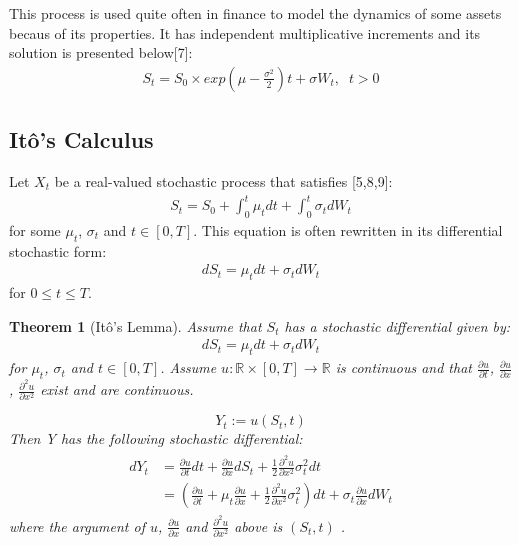\documentclass[12pt,twoside]{reedthesis}
\newtheorem{theorem}{Theorem}[section]
\theoremstyle{definition}
\theoremstyle{definition}
\theoremstyle{remark}
\begin{document}
  This process is used quite often in finance to model the dynamics of
  some assets becaus of its properties. It has independent multiplicative
  increments and its solution is presented below{[}7{]}:
  \begin{align}
  S_t = S_0 \times exp{\left(\mu - \frac{\sigma^2}{2} \right) t + \sigma W_t}, \;\; t > 0
  \end{align}
  \subsection{Itô's Calculus}\label{itos-calculus}
  
  Let \(X_{t}\) be a real-valued stochastic process that satisfies
  {[}5,8,9{]}:
  \begin{align}
  S_t = S_0 + \int_{0}^{t} \mu_t dt + \int_{0}^{t} \sigma_t dW_t
  \end{align}
  \noindent
  for some \(\mu_t\), \(\sigma_t\) and \(t \in [0,T]\). This equation is
  often rewritten in its differential stochastic form:
  \begin{align}
  dS_t = \mu_t dt + \sigma_t dW_t 
  \end{align}
  \noindent
  for \(0 \leq t \leq T\).
  \begin{theorem}[Itô's Lemma]
  Assume that $S_t$ has a stochastic differential given by:
  \begin{align}
  dS_t = \mu_t dt + \sigma_t dW_t 
  \end{align}
  \noindent
  for $\mu_t$, $\sigma_t$ and $t \in [0,T]$. Assume $u: \mathbb{R} \times [0, T] \rightarrow \mathbb{R}$ is continuous and that $\frac{\partial u}{\partial t}$, $\frac{\partial u}{\partial x}$, $\frac{\partial^2 u}{\partial x^2}$ exist and are continuous.
  
  $$Y_t := u(S_t, t)$$
  \noindent
  Then Y has the following stochastic differential:
  \begin{align} 
  \label{eq:ito}
  \begin{split}
      dY_t &= \frac{\partial u}{\partial t}dt + \frac{\partial u}{\partial x} dS_t + \frac{1}{2}\frac{\partial^2 u}{\partial x^2}\sigma_t^2 dt  \\[10pt] 
      &= \left( \frac{\partial u}{\partial t} + \mu_t \frac{\partial u}{\partial x} + \frac{1}{2}\frac{\partial^2 u}{\partial x^2}\sigma_t^2 \right) dt + \sigma_t \frac{\partial u}{\partial x} dW_t
  \end{split}
  \end{align}
  \noindent 
  where the argument of $u$, $\frac{\partial u}{\partial x}$ and $\frac{\partial^2 u}{\partial x^2}$ above is $\left( S_t, t \right)$ .
  \end{theorem}
\end{document}
